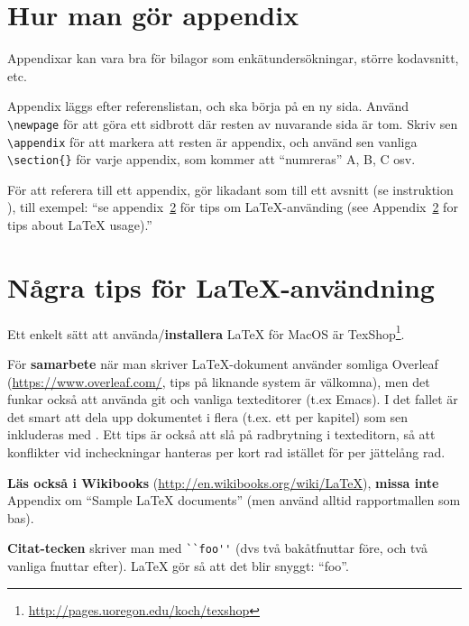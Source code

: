 
\section{Hur man gör appendix}
\label{app:appendix}
Appendixar kan vara bra för bilagor som enkätundersökningar, större kodavsnitt, etc. 

Appendix läggs efter referenslistan, och ska börja på en ny sida. Använd \verb|\newpage| för att göra ett sidbrott där resten av nuvarande sida är tom. Skriv sen \verb|\appendix| för att markera att resten är appendix, och 
 använd sen vanliga \verb|\section{}| för varje appendix, som kommer att ``numreras'' A, B, C osv.

För att referera till ett appendix, gör likadant som till ett avsnitt (se instruktion ), till exempel: ``se appendix~\ref{app:latex} för tips om La\TeX-använding (see Appendix~\ref{app:latex} for tips about La\TeX{} usage).''

\section{Några tips för La\TeX-användning}
\label{app:latex}

Ett enkelt sätt att använda/\textbf{installera} LaTeX för MacOS är TexShop\footnote{\url{http://pages.uoregon.edu/koch/texshop}}.

För \textbf{samarbete} när man skriver La\TeX-dokument använder somliga Overleaf (\url{https://www.overleaf.com/}, tips på liknande system är välkomna), men det funkar också att använda git och vanliga texteditorer (t.ex Emacs). I det fallet är det smart att dela upp dokumentet i flera (t.ex. ett per kapitel) som sen inkluderas med \verb||. Ett tips är också att slå på radbrytning i texteditorn, så att konflikter vid incheckningar hanteras per kort rad istället för per jättelång rad.

\textbf{Läs också i Wikibooks} (\url{http://en.wikibooks.org/wiki/LaTeX}), \textbf{missa inte} Appendix om ``Sample LaTeX documents'' (men använd alltid rapportmallen som bas).

\textbf{Citat-tecken} skriver man med \verb|``foo''| (dvs två bakåtfnuttar före, och två vanliga fnuttar efter). LaTeX gör så att det blir snyggt: ``foo''.

